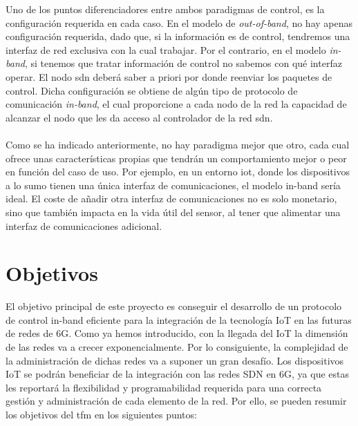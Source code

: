 Uno de los puntos diferenciadores entre ambos paradigmas de control, es la configuración requerida en cada caso. En el modelo de \textit{out-of-band}, no hay apenas configuración requerida, dado que, si la información es de control, tendremos una interfaz de red exclusiva con la cual trabajar. Por el contrario, en el modelo \textit{in-band}, si tenemos que tratar información de control no sabemos con qué interfaz operar. El nodo \gls{sdn} deberá saber a priori por donde reenviar los paquetes de control. Dicha configuración se obtiene de algún tipo de protocolo de comunicación \textit{in-band}, el cual proporcione a cada nodo de la red la capacidad de alcanzar el nodo que les da acceso al controlador de la red \gls{sdn}.\\
\\
Como se ha indicado anteriormente, no hay paradigma mejor que otro, cada cual ofrece unas características propias que tendrán un comportamiento mejor o peor en función del caso de uso. Por ejemplo, en un entorno \gls{iot}, donde los dispositivos a lo sumo tienen una única interfaz de comunicaciones, el modelo in-band sería ideal. El coste de añadir otra interfaz de comunicaciones no es solo monetario, sino que también impacta en la vida útil del sensor, al tener que alimentar una interfaz de comunicaciones adicional.


\section{Objetivos}
\label{sec:obj}

El objetivo principal de este proyecto es conseguir el desarrollo de un protocolo de control in-band eficiente para la integración de la tecnología IoT en las futuras de redes de 6G. Como ya hemos introducido, con la llegada del IoT la dimensión de las redes va a crecer exponencialmente. Por lo consiguiente, la complejidad de la administración de dichas redes va a suponer un gran desafío. Los dispositivos IoT se podrán beneficiar de la integración con las redes SDN en 6G, ya que estas les reportará la flexibilidad y programabilidad requerida para una correcta gestión y administración de cada elemento de la red. Por ello, se pueden resumir los objetivos del \gls{tfm} en los siguientes puntos:

